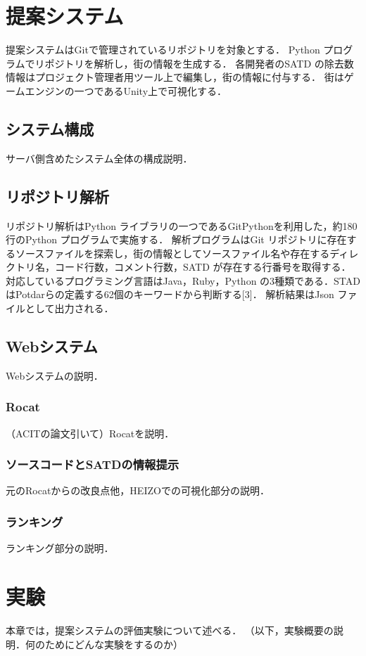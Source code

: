 \documentclass[12pt]{jarticle} %
\begin{document}
\newpage
\section{提案システム}
提案システムはGitで管理されているリポジトリを対象とする．
Python プログラムでリポジトリを解析し，街の情報を生成する．
各開発者のSATD の除去数情報はプロジェクト管理者用ツール上で編集し，街の情報に付与する．
街はゲームエンジンの一つであるUnity上で可視化する．

\subsection{システム構成}
サーバ側含めたシステム全体の構成説明．

\subsection{リポジトリ解析}
リポジトリ解析はPython ライブラリの一つであるGitPythonを利用した，約180 行のPython プログラムで実施する．
解析プログラムはGit リポジトリに存在するソースファイルを探索し，街の情報としてソースファイル名や存在するディレクトリ名，コード行数，コメント行数，SATD が存在する行番号を取得する．
対応しているプログラミング言語はJava，Ruby，Python の3種類である．STAD はPotdarらの定義する62個のキーワードから判断する[3]．
解析結果はJson ファイルとして出力される．

\subsection{Webシステム}
Webシステムの説明．

\subsubsection{Rocat}
（ACITの論文引いて）Rocatを説明．

\subsubsection{ソースコードとSATDの情報提示}
元のRocatからの改良点他，HEIZOでの可視化部分の説明．

\subsubsection{ランキング}
ランキング部分の説明．


\newpage
\section{実験}
本章では，提案システムの評価実験について述べる．
（以下，実験概要の説明．何のためにどんな実験をするのか）
\end{document}
